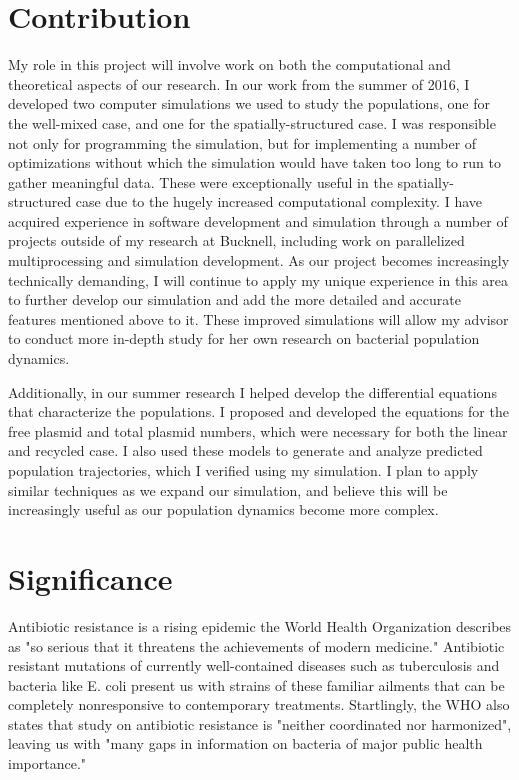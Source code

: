 \documentclass[numbib]{buthesis_p}  %
\begin{document}
\section{Contribution}
My role in this project will involve work on both the computational and theoretical
aspects of our research. In our work from the summer of 2016, I developed two
computer simulations we used to study the populations, one for the well-mixed case,
and one for the spatially-structured case. I was responsible not
only for programming the simulation, but for implementing a number of optimizations
without which the simulation would have taken too long to run to gather meaningful
data. These were exceptionally useful in the spatially-structured case due to the
hugely increased computational complexity.
I have acquired experience in software development and simulation through a number
of projects outside of my research at Bucknell, including work on parallelized
multiprocessing and simulation development. As our project becomes increasingly
technically demanding, I will continue to apply my unique experience in this area to further develop
our simulation and add the more detailed and accurate features mentioned above to it.
These improved simulations will allow my advisor to conduct more in-depth study
for her own research on bacterial population dynamics.

Additionally, in our summer research I helped develop the differential equations
that characterize the populations. I proposed and developed the equations
for the free plasmid and total plasmid numbers, which were necessary for both
the linear and recycled case. I also used these models to generate and analyze predicted
population trajectories\cite{nldynamics}, which I verified using my simulation. I plan to apply
similar techniques as we expand our simulation, and believe this will be
increasingly useful as our population dynamics become more complex.

\section{Significance}
Antibiotic resistance is a rising epidemic the World Health Organization
describes as "so serious that it threatens the achievements of modern medicine."\cite{who}
Antibiotic resistant mutations of currently well-contained diseases such as
tuberculosis and bacteria like E. coli present us with strains of these
familiar ailments that can be completely nonresponsive to contemporary treatments.
Startlingly, the WHO also states that study on antibiotic resistance is
"neither coordinated nor harmonized", leaving us with
"many gaps in information on bacteria of major public health importance."\cite{who}
\end{document}
